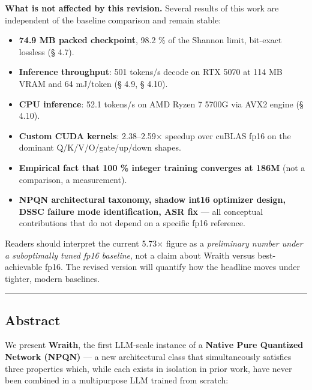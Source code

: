 \textbf{What is not affected by this revision.} Several results of this
work are independent of the baseline comparison and remain stable:

\begin{itemize}
\tightlist
\item
  \textbf{74.9 MB packed checkpoint}, 98.2 \% of the Shannon limit,
  bit-exact lossless (§ 4.7).
\item
  \textbf{Inference throughput}: 501 tokens/s decode on RTX 5070 at 114
  MB VRAM and 64 mJ/token (§ 4.9, § 4.10).
\item
  \textbf{CPU inference}: 52.1 tokens/s on AMD Ryzen 7 5700G via AVX2
  engine (§ 4.10).
\item
  \textbf{Custom CUDA kernels}: 2.38--2.59× speedup over cuBLAS fp16 on
  the dominant Q/K/V/O/gate/up/down shapes.
\item
  \textbf{Empirical fact that 100 \% integer training converges at 186M}
  (not a comparison, a measurement).
\item
  \textbf{NPQN architectural taxonomy, shadow int16 optimizer design,
  DSSC failure mode identification, ASR fix} --- all conceptual
  contributions that do not depend on a specific fp16 reference.
\end{itemize}

Readers should interpret the current 5.73× figure as a \emph{preliminary
number under a suboptimally tuned fp16 baseline}, not a claim about
Wraith versus best-achievable fp16. The revised version will quantify
how the headline moves under tighter, modern baselines.

\begin{center}\rule{0.5\linewidth}{0.5pt}\end{center}

\subsection{Abstract}\label{abstract}

We present \textbf{Wraith}, the first LLM-scale instance of a
\textbf{Native Pure Quantized Network (NPQN)} --- a new architectural
class that simultaneously satisfies three properties which, while each
exists in isolation in prior work, have never been combined in a
multipurpose LLM trained from scratch:

